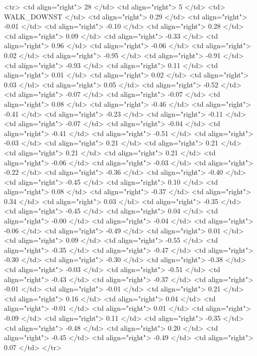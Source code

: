   <tr> <td align="right"> 28 </td> <td align="right">   5 </td> <td> WALK_DOWNST </td> <td align="right"> 0.29 </td> <td align="right"> -0.01 </td> <td align="right"> -0.10 </td> <td align="right"> 0.28 </td> <td align="right"> 0.09 </td> <td align="right"> -0.33 </td> <td align="right"> 0.96 </td> <td align="right"> -0.06 </td> <td align="right"> 0.02 </td> <td align="right"> -0.95 </td> <td align="right"> -0.91 </td> <td align="right"> -0.93 </td> <td align="right"> 0.11 </td> <td align="right"> 0.01 </td> <td align="right"> 0.02 </td> <td align="right"> 0.03 </td> <td align="right"> 0.05 </td> <td align="right"> -0.52 </td> <td align="right"> -0.07 </td> <td align="right"> -0.07 </td> <td align="right"> 0.08 </td> <td align="right"> -0.46 </td> <td align="right"> -0.41 </td> <td align="right"> -0.23 </td> <td align="right"> -0.11 </td> <td align="right"> -0.07 </td> <td align="right"> -0.04 </td> <td align="right"> -0.41 </td> <td align="right"> -0.51 </td> <td align="right"> -0.03 </td> <td align="right"> 0.21 </td> <td align="right"> 0.21 </td> <td align="right"> 0.21 </td> <td align="right"> 0.21 </td> <td align="right"> -0.06 </td> <td align="right"> -0.03 </td> <td align="right"> -0.22 </td> <td align="right"> -0.36 </td> <td align="right"> -0.40 </td> <td align="right"> -0.45 </td> <td align="right"> 0.10 </td> <td align="right"> 0.08 </td> <td align="right"> -0.37 </td> <td align="right"> 0.34 </td> <td align="right"> 0.03 </td> <td align="right"> -0.35 </td> <td align="right"> -0.45 </td> <td align="right"> 0.04 </td> <td align="right"> -0.00 </td> <td align="right"> -0.04 </td> <td align="right"> -0.06 </td> <td align="right"> -0.49 </td> <td align="right"> 0.01 </td> <td align="right"> 0.09 </td> <td align="right"> -0.55 </td> <td align="right"> -0.35 </td> <td align="right"> -0.47 </td> <td align="right"> -0.30 </td> <td align="right"> -0.30 </td> <td align="right"> -0.38 </td> <td align="right"> -0.03 </td> <td align="right"> -0.51 </td> <td align="right"> -0.43 </td> <td align="right"> -0.37 </td> <td align="right"> -0.01 </td> <td align="right"> -0.01 </td> <td align="right"> 0.21 </td> <td align="right"> 0.16 </td> <td align="right"> 0.04 </td> <td align="right"> -0.01 </td> <td align="right"> 0.01 </td> <td align="right"> -0.09 </td> <td align="right"> 0.11 </td> <td align="right"> -0.35 </td> <td align="right"> -0.48 </td> <td align="right"> 0.20 </td> <td align="right"> -0.45 </td> <td align="right"> -0.49 </td> <td align="right"> 0.07 </td> </tr>
